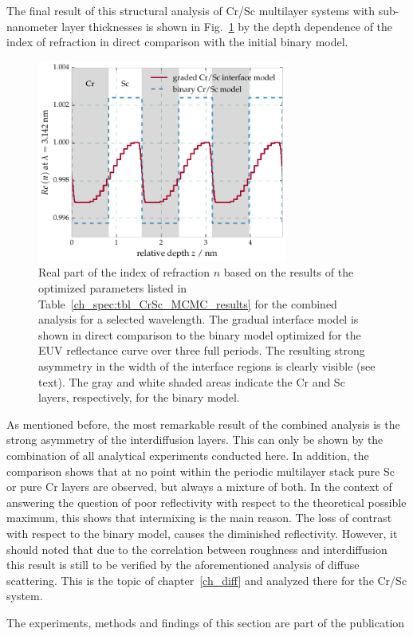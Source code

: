 The final result of this structural analysis of Cr/Sc multilayer systems with sub-nanometer layer thicknesses is shown in Fig.~\ref{ch_spec:fig_CrSc_electron_density_profile} by the depth dependence of the index of refraction in direct comparison with the initial binary model.
\begin{figure}[htbp]
  \centering
  \includegraphics[width=0.73\textwidth]{img/CrSc_binary_vs_fitted_gradual_model}
  \caption[Multilayer structure for best binary and gradual model results.]{Real part of the index of refraction $n$  based on the results of 
the optimized parameters listed in Table~\ref{ch_spec:tbl_CrSc_MCMC_results} for the combined 
analysis for a selected wavelength. The gradual interface model is shown in 
direct comparison to the binary model optimized for the EUV reflectance curve 
over three full periods. The resulting strong asymmetry in the width of the 
interface regions is clearly visible (see text). The gray and white shaded 
areas indicate the Cr and Sc layers, respectively, for the binary model.}
  \label{ch_spec:fig_CrSc_electron_density_profile}
\end{figure}
As mentioned before, the most remarkable result of the combined analysis is the strong asymmetry of the interdiffusion layers. This can only be shown by the combination of all 
analytical experiments conducted here. In addition, the comparison shows that at no point within the periodic multilayer stack pure Sc or pure Cr layers are observed, but always a mixture of both. In the context of answering the question of poor reflectivity with respect to the theoretical possible maximum, this shows that intermixing is the main reason. The loss of contrast with respect to the binary model, causes the diminished reflectivity. However, it should noted that due to the correlation between roughness and interdiffusion this result is still to be verified by the aforementioned analysis of diffuse scattering. This is the topic of chapter~\ref{ch_diff} and analyzed there for the Cr/Sc system.

The experiments, methods and findings of this section are part of the publication 


